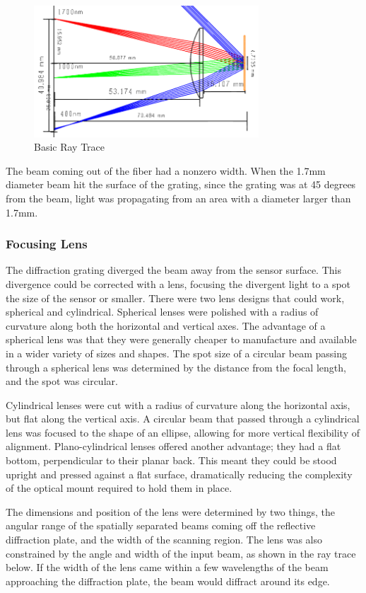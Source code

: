 \begin{figure}[H]
    \caption{Basic Ray Trace}
    \centering
    \includegraphics[width=0.75\textwidth]{images/RayTrace.png}
\end{figure}

The beam coming out of the fiber had a nonzero width. When the 1.7mm diameter beam hit the surface of the grating, since the grating was at 45 degrees from the beam, light was propagating from an area with a diameter larger than 1.7mm.

\subsubsection{Focusing Lens} The diffraction grating diverged the beam away from the sensor surface. This divergence could be corrected with a lens, focusing the divergent light to a spot the size of the sensor or smaller. There were two lens designs that could work, spherical and cylindrical. Spherical lenses were polished with a radius of curvature along both the horizontal and vertical axes. The advantage of a spherical lens was that they were generally cheaper to manufacture and available in a wider variety of sizes and shapes. The spot size of a circular beam passing through a spherical lens was determined by the distance from the focal length, and the spot was circular.

Cylindrical lenses were cut with a radius of curvature along the horizontal axis, but flat along the vertical axis. A circular beam that passed through a cylindrical lens was focused to the shape of an ellipse, allowing for more vertical flexibility of alignment. Plano-cylindrical lenses offered another advantage; they had a flat bottom, perpendicular to their planar back. This meant they could be stood upright and pressed against a flat surface, dramatically reducing the complexity of the optical mount required to hold them in place.

The dimensions and position of the lens were determined by two things, the angular range of the spatially separated beams coming off the reflective diffraction plate, and the width of the scanning region. The lens was also constrained by the angle and width of the input beam, as shown in the ray trace below. If the width of the lens came within a few wavelengths of the beam approaching the diffraction plate, the beam would diffract around its edge.

